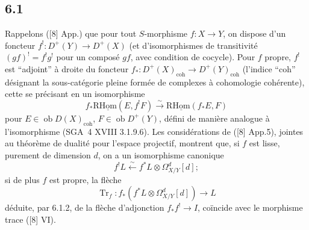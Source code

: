 \subsection*{6.1}
Rappelons ([8] App.) que pour tout $S$-morphisme $f:X\to Y$, on dispose d'un foncteur $f^!:D^+(Y)\longrightarrow D^+(X)$ (et d'isomorphismes de transitivité $(gf)^! = f^!g^!$ pour un composé $gf$, avec condition de cocycle). Pour $f$ propre, $f^!$ est ``adjoint'' à droite du foncteur $f_*:D^+(X)_{\mathrm{coh}}\to D^+(Y)_{\mathrm{coh}}$ (l'indice ``coh'' désignant la sous-catégorie pleine formée de complexes à cohomologie cohérente), cette  se précisant en un isomorphisme
\begin{equation}
\tag{6.1.1}
f_*\mathrm{R}\underline{\mathrm{Hom}}(E,f^!F)\xrightarrow{\sim}\mathrm{R}\underline{\mathrm{Hom}}(f_*E,F)
\end{equation}
pour $E\in\operatorname{ob}D(X)_{\mathrm{coh}}$, $F\in\operatorname{ob}D^+(Y)$, défini de manière analogue à l'isomorphisme (SGA~4 XVIII 3.1.9.6). Les considérations de ([8] App.5), jointes au théorème de dualité pour l'espace projectif, montrent que, si $f$ est lisse, purement de dimension $d$, on a un isomorphisme canonique
\begin{equation}
\tag{6.1.2}
f^!L\xleftarrow{\sim} f^*L\otimes\Omega^d_{X/Y}[d];
\end{equation}
si de plus $f$ est propre, la flèche
\begin{equation}
\tag{6.1.3}
\operatorname{Tr}_f:f_*(f^*L\otimes\Omega^d_{X/Y}[d])\longrightarrow L
\end{equation}
déduite, par 6.1.2, de la flèche d'adjonction $f_*f^!\to I$, coïncide avec le morphisme trace ([8] VI).

